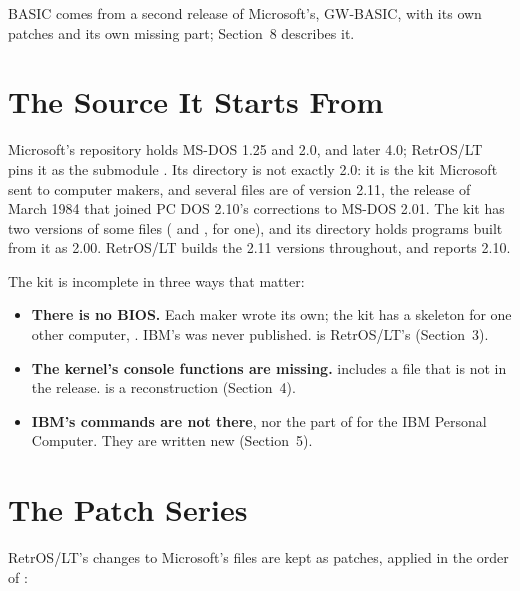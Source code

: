 BASIC comes from a second release of Microsoft's, GW-BASIC, with its
own patches and its own missing part; Section~8 describes it.

\section{The Source It Starts From}

Microsoft's repository holds MS-DOS 1.25 and 2.0, and later 4.0; RetrOS/LT
pins it as the submodule . Its 
directory is not exactly 2.0: it is the kit Microsoft sent to computer
makers, and several files are of version 2.11, the release of March 1984
that joined PC DOS 2.10's corrections to MS-DOS 2.01. The kit has two
versions of some files ( and ,
for one), and its  directory holds programs built from it as
2.00. RetrOS/LT builds the 2.11 versions throughout, and reports 2.10.

The kit is incomplete in three ways that matter:

\begin{itemize}
\item \textbf{There is no BIOS.} Each maker wrote its own; the kit has a
  skeleton for one other computer, . IBM's was never
  published.  is RetrOS/LT's (Section~3).
\item \textbf{The kernel's console functions are missing.}
   includes a file  that is not in the
  release.  is a reconstruction (Section~4).
\item \textbf{IBM's commands are not there}, nor the part of
   for the IBM Personal Computer. They are written new
  (Section~5).
\end{itemize}

\section{The Patch Series}

RetrOS/LT's changes to Microsoft's files are kept as patches, applied in
the order of :


